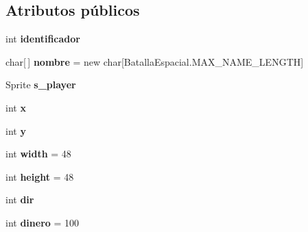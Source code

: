 \subsection*{Atributos públicos}
\begin{DoxyCompactItemize}
\item 
\hypertarget{classBatallaEspacial_1_1Player_a4f47036aa77e949d6c6c2d58017bef2c}{
int {\bfseries identificador}}
\label{classBatallaEspacial_1_1Player_a4f47036aa77e949d6c6c2d58017bef2c}

\item 
\hypertarget{classBatallaEspacial_1_1Player_ae7437859783d6aee4f265e87325b0d73}{
char\mbox{[}$\,$\mbox{]} {\bfseries nombre} = new char\mbox{[}BatallaEspacial.MAX\_\-NAME\_\-LENGTH\mbox{]}}
\label{classBatallaEspacial_1_1Player_ae7437859783d6aee4f265e87325b0d73}

\item 
\hypertarget{classBatallaEspacial_1_1Player_ab9ec508713b1a68bd68b0a9d38cb99aa}{
Sprite {\bfseries s\_\-player}}
\label{classBatallaEspacial_1_1Player_ab9ec508713b1a68bd68b0a9d38cb99aa}

\item 
\hypertarget{classBatallaEspacial_1_1Player_a2d9b182341628ab268513d7faed85dae}{
int {\bfseries x}}
\label{classBatallaEspacial_1_1Player_a2d9b182341628ab268513d7faed85dae}

\item 
\hypertarget{classBatallaEspacial_1_1Player_ae03cd441479ff2ed6c17d75d08beb4b6}{
int {\bfseries y}}
\label{classBatallaEspacial_1_1Player_ae03cd441479ff2ed6c17d75d08beb4b6}

\item 
\hypertarget{classBatallaEspacial_1_1Player_a76c8a34ac16350e586ac64bc661672e2}{
int {\bfseries width} = 48}
\label{classBatallaEspacial_1_1Player_a76c8a34ac16350e586ac64bc661672e2}

\item 
\hypertarget{classBatallaEspacial_1_1Player_adfa7ef37f4fd40ed5bbcd927cbf9fbf4}{
int {\bfseries height} = 48}
\label{classBatallaEspacial_1_1Player_adfa7ef37f4fd40ed5bbcd927cbf9fbf4}

\item 
\hypertarget{classBatallaEspacial_1_1Player_a42e7f71d955b934dccd1083c30602e75}{
int {\bfseries dir}}
\label{classBatallaEspacial_1_1Player_a42e7f71d955b934dccd1083c30602e75}

\item 
\hypertarget{classBatallaEspacial_1_1Player_a4007d25d5e30b7121de47fdf452df331}{
int {\bfseries dinero} = 100}
\label{classBatallaEspacial_1_1Player_a4007d25d5e30b7121de47fdf452df331}


\end{DoxyCompactItemize}
